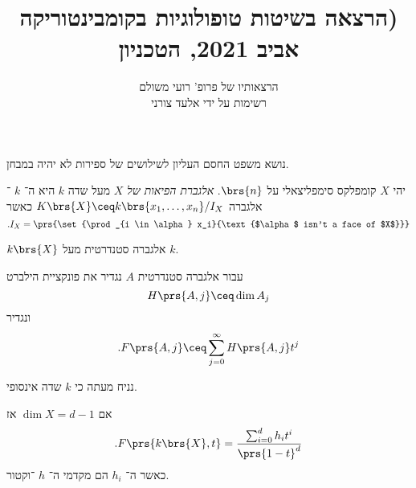 \documentclass[10pt]{article}
\title{הרצאה בשיטות טופולוגיות בקומבינטוריקה) \\ \large{אביב 2021, הטכניון}}
\author{הרצאותיו של פרופ' רועי משולם \\ \large רשימות על ידי אלעד צורני}
\begin{document}
\begin{remark}
נושא משפט החסם העליון לשילושים של ספירות לא יהיה במבחן.
\end{remark}

\begin{definition}
יהי
$X$
קומפלקס סימפליצאלי על
$\brs{n}$.
\emph{אלגברת הפיאות של
$X$}
מעל שדה
$k$
היא ה־%
$k$%
־אלגברה
$K\brs{X} \ceq k\brs{x_1, \ldots, x_n}/I_X$
כאשר
\[\text{.} I_X = \prs{\set{\prod_{i \in \alpha} x_i}{\text{$\alpha$ isn't a face of $X$}}}\]
\end{definition}

\begin{remark}
$k\brs{X}$
אלגברה סטנדרטית מעל
$k$.
\end{remark}

\begin{definition}
עבור אלגברה סטנדרטית
$A$
נגדיר את פונקציית הילברט
\[H\prs{A,j} \ceq \dim A_j\]
ונגדיר
\[\text{.} F\prs{A,j} \ceq \sum_{j=0}^{\infty} H\prs{A,j} t^j\]
\end{definition}

נניח מעתה כי
$k$
שדה אינסופי.

\begin{proposition}
אם
$\dim X = d- 1$
אז
\[\text{.} F\prs{k\brs{X}, t} = \frac{\sum_{i=0}^d h_i t^i}{\prs{1-t}^d}\]
כאשר ה־%
$h_i$
הם מקדמי ה־%
$h$%
־וקטור.
\end{proposition}
\end{document}
